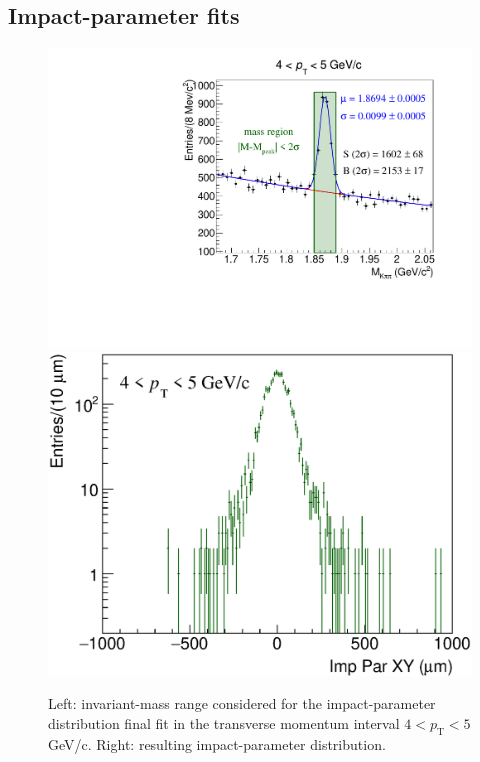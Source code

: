 \documentclass[b5paper,10pt,twoside,oldstyle,classica]{toptesi}
\newcommand{\pt}{p_\text{T}}
\begin{document}
\subsection{Impact-parameter fits}
\label{IPfit_data}
\begin{figure}[tb]
\begin{center}
{\includegraphics[scale = 0.32]{Mass_4-5_fit.pdf}}
\hspace{-0.5cm}
{\includegraphics[scale = 0.32]{ImpParData_4-5.eps}}
\caption{Left: invariant-mass range considered for the impact-parameter distribution final fit in the transverse momentum interval $4<\pt<5$ GeV/c. Right: resulting impact-parameter distribution.}
\label{mass_range}
\end{center}
\end{figure}
\end{document}
